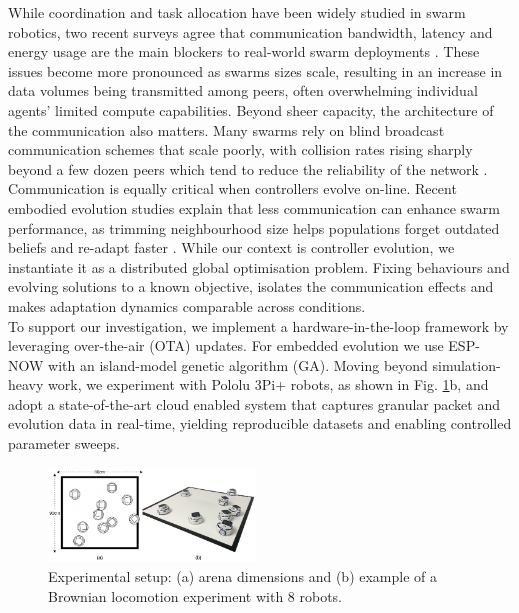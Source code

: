 \documentclass[conference]{IEEEtran}
\begin{document}
While coordination and task allocation have been widely studied in swarm robotics, two recent surveys agree that communication bandwidth, latency and energy usage are the main blockers to real-world swarm deployments \cite{ding_advancements_2023}\cite{an_multi-robot_2023}. These issues become more pronounced as swarms sizes scale, resulting in an increase in data volumes being transmitted among peers, often overwhelming individual agents' limited compute capabilities. Beyond sheer capacity, the architecture of the communication also matters. Many swarms rely on blind broadcast communication schemes that scale poorly, with collision rates rising sharply beyond a few dozen peers which tend to reduce the reliability of the network \cite{an_multi-robot_2023}. \\

Communication is equally critical when controllers evolve on-line. Recent embodied evolution studies explain that less communication can enhance swarm performance, as trimming neighbourhood size helps populations forget outdated beliefs and re-adapt faster \cite{hiraga_when_2023}\cite{ding_advancements_2023}. While our context is controller evolution, we instantiate it as a distributed global optimisation problem. Fixing behaviours and evolving solutions to a known objective, isolates the communication effects and makes adaptation dynamics comparable across conditions. \\

To support our investigation, we implement a hardware-in-the-loop framework by leveraging over-the-air (OTA) updates. For embedded evolution we use ESP-NOW with an island-model genetic algorithm (GA). Moving beyond simulation-heavy work, we experiment with Pololu 3Pi+ robots, as shown in Fig. \ref{fig:arena}b, and adopt a state-of-the-art cloud enabled system that captures granular packet and evolution data in real-time, yielding reproducible datasets and enabling controlled parameter sweeps.

\begin{figure}[H]
    \centering
    \includegraphics[width=0.49\textwidth]{arena.png}
    \caption{Experimental setup: (a) arena dimensions and (b) example of a Brownian locomotion experiment with 8 robots.}
    \label{fig:arena}
\end{figure}
\end{document}
